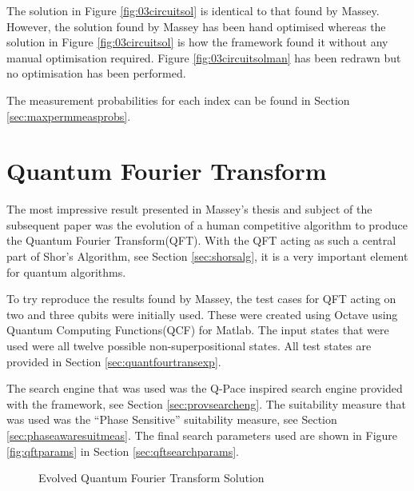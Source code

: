 The solution in Figure \ref{fig:03circuitsol} is identical to that found by Massey\cite{masseythesis}.
However, the solution found by Massey has been hand optimised whereas the solution in Figure \ref{fig:03circuitsol} is how the framework found it without any manual optimisation required.
Figure \ref{fig:03circuitsolman} has been redrawn but no optimisation has been performed.

The measurement probabilities for each index can be found in Section \ref{sec:maxpermmeasprobs}.



\section{Quantum Fourier Transform}
\label{sec:evoqft}

The most impressive result presented in Massey's thesis\cite{masseythesis} and subject of the subsequent paper\cite{Massey:2005:EHQ:1068009.1068288} was the evolution of a human competitive algorithm to produce the Quantum Fourier Transform(QFT).
With the QFT acting as such a central part of Shor's Algorithm, see Section \ref{sec:shorsalg}, it is a very important element for quantum algorithms.

To try reproduce the results found by Massey, the test cases for QFT acting on two and three qubits were initially used.
These were created using Octave\cite{octweb} using Quantum Computing Functions(QCF) for Matlab\cite{qcfweb}.
The input states that were used were all twelve possible non-superpositional states.
All test states are provided in Section \ref{sec:quantfourtransexp}.

The search engine that was used was the Q-Pace inspired search engine provided with the framework, see Section \ref{sec:provsearcheng}.
The suitability measure that was used was the ``Phase Sensitive'' suitability measure, see Section \ref{sec:phaseawaresuitmeas}.
The final search parameters used are shown in Figure \ref{fig:qftparams} in Section \ref{sec:qftsearchparams}.

\begin{figure}
\centering
{}
\caption{Evolved Quantum Fourier Transform Solution}
\label{fig:evoqftsol}
\end{figure}

